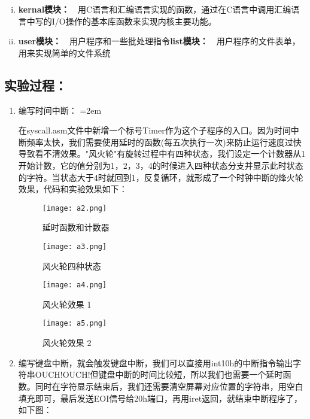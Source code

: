 \documentclass[UTF8]{article}
\begin{document}
\begin{enumerate}[1)]
\begin {enumerate}[i)]
			\item {\bfseries{kernal模块：}}\ \ 用C语言和汇编语言实现的函数，通过在C语言中调用汇编语言中写的I/O操作的基本库函数来实现内核主要功能。{\color{red}{新增：自己编写时间中断20h，键盘中断09h和33、34、35、36号用户子程序}}
			\item {\bfseries{user模块：}}\ \ 用户程序和一些批处理指令{\bfseries{list模块：}}\ \ 用户程序的文件表单，用来实现简单的文件系统
		\end{enumerate}
\end{enumerate}

\subsection{实验过程：}
\begin{enumerate}[1)]
\heiti\setlength{\itemsep}{0em}
	\item 编写时间中断：	
	\parindent=2em %
	\par\indent 
	在syscall.asm文件中新增一个标号Timer作为这个子程序的入口。因为时间中断频率太快，我们需要使用延时的函数(每五次执行一次)来防止运行速度过快导致看不清效果。"风火轮"有旋转过程中有四种状态，我们设定一个计数器从1开始计数，它的值分别为1，2，3，4的时候进入四种状态分支并显示此时状态的字符。当状态大于4时就回到1，反复循环，就形成了一个时钟中断的烽火轮效果，代码和实验效果如下：
			\begin{figure}[htbp]
			\begin{minipage}[t]{0.5\linewidth}
			\centering
			\texttt{[image: a2.png]}
			\caption{延时函数和计数器}
			\end{minipage}
			\begin{minipage}[t]{0.5\linewidth}
				\centering
			\texttt{[image: a3.png]}
			\caption{风火轮四种状态}
			\end{minipage}
		\end{figure}
		\begin{figure}[htbp]
			\begin{minipage}[t]{0.5\linewidth}
			\centering
			\texttt{[image: a4.png]}
			\caption{风火轮效果 1}
			\end{minipage}
			\begin{minipage}[t]{0.5\linewidth}
				\centering
			\texttt{[image: a5.png]}
			\caption{风火轮效果 2}
			\end{minipage}
		\end{figure}
	\item 编写键盘中断，就会触发键盘中断，我们可以直接用int10h的中断指令输出字符串OUCH!OUCH!但键盘中断的时间比较短，所以我们也需要一个延时函数。同时在字符显示结束后，我们还需要清空屏幕对应位置的字符串，用空白填充即可，最后发送EOI信号给20h端口，再用iret返回，就结束中断程序了，如下图：

\end{enumerate}
\end{document}
